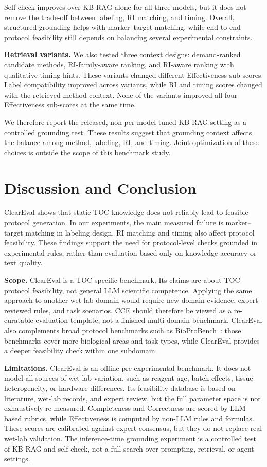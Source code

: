 \documentclass[conference]{IEEEtran}
\begin{document}
Self-check improves over KB-RAG alone for all three models, but it does not
remove the trade-off between labeling, RI matching, and timing. Overall,
structured grounding helps with marker--target matching, while end-to-end
protocol feasibility still depends on balancing several experimental
constraints.

\noindent\textbf{Retrieval variants.}
We also tested three context designs: demand-ranked candidate methods,
RI-family-aware ranking, and RI-aware ranking with qualitative timing hints.
These variants changed different Effectiveness sub-scores. Label compatibility
improved across variants, while RI and timing scores changed with the retrieved
method context. None of the variants improved all four Effectiveness sub-scores
at the same time.

We therefore report the released, non-per-model-tuned KB-RAG setting as a
controlled grounding test. These results suggest that grounding context affects
the balance among method, labeling, RI, and timing. Joint optimization of these
choices is outside the scope of this benchmark study.

\section{Discussion and Conclusion}\label{sec:discussion}

ClearEval shows that static TOC knowledge does not reliably lead to feasible
protocol generation. In our experiments, the main measured failure is
marker--target matching in labeling design. RI matching and timing also affect
protocol feasibility. These findings support the need for protocol-level checks grounded in experimental rules, rather than evaluation based only on knowledge accuracy or text quality.

\noindent\textbf{Scope.}
ClearEval is a TOC-specific benchmark. Its claims are about TOC protocol
feasibility, not general LLM scientific competence. Applying the same approach
to another wet-lab domain would require new domain evidence, expert-reviewed
rules, and task scenarios. CCE should therefore be viewed as a re-curatable
evaluation template, not a finished multi-domain benchmark. ClearEval also
complements broad protocol benchmarks such as BioProBench~\cite{bioprobench}:
those benchmarks cover more biological areas and task types, while ClearEval
provides a deeper feasibility check within one subdomain.

\noindent\textbf{Limitations.}
ClearEval is an offline pre-experimental benchmark. It does not model all
sources of wet-lab variation, such as reagent age, batch effects, tissue
heterogeneity, or hardware differences. Its feasibility database is based on
literature, wet-lab records, and expert review, but the full parameter space is
not exhaustively re-measured. Completeness and Correctness are scored by
LLM-based rubrics, while Effectiveness is computed by non-LLM rules and
formulas. These scores are calibrated against expert consensus, but they do not
replace real wet-lab validation. The inference-time grounding experiment is a
controlled test of KB-RAG and self-check, not a full search over prompting,
retrieval, or agent settings.
\end{document}
